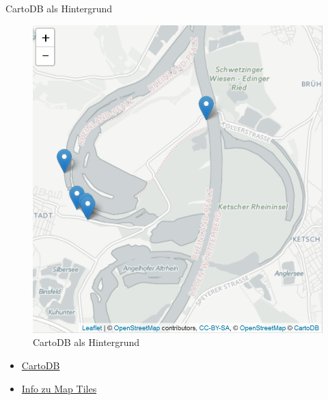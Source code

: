 \documentclass[ignorenonframetext,]{beamer}
\newenvironment{Shaded}{\begin{snugshade}}{\end{snugshade}}
\newcommand{\KeywordTok}[1]{\textcolor[rgb]{0.26,0.66,0.93}{\textbf{#1}}}
\newcommand{\NormalTok}[1]{\textcolor[rgb]{0.74,0.68,0.62}{#1}}
\newcommand{\OperatorTok}[1]{\textcolor[rgb]{0.74,0.68,0.62}{#1}}
\newcommand{\StringTok}[1]{\textcolor[rgb]{0.02,0.61,0.04}{#1}}
\begin{document}
\begin{frame}[fragile]{CartoDB als Hintergrund}
\protect\hypertarget{cartodb-als-hintergrund}{}

\begin{Shaded}
\end{Shaded}

\begin{figure}
\centering
\includegraphics{figure/CartoDBInteractive.PNG}
\caption{CartoDB als Hintergrund}
\end{figure}

\begin{itemize}
\item
  \href{https://carto.com/attribution}{CartoDB}
\item
  \href{https://www.mapbox.com/help/how-web-maps-work/}{Info zu Map
  Tiles}
\end{itemize}

\end{frame}
\end{document}

